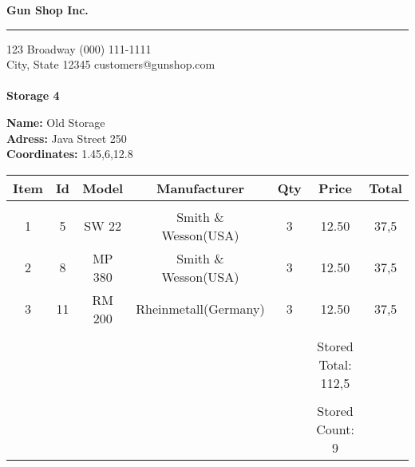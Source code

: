 \documentclass{article}
\begin{document}
\hfil{\Huge\bf Gun Shop Inc.}\hfil
\bigskip
\hrule
\bigskip

123 Broadway \hfill (000) 111-1111 \\
City, State 12345 \hfill customers@gunshop.com\\ \\

\hfill{\bf Storage 4}\hfill
\bigskip

{\bf Name:}   Old Storage\\
{\bf Adress:}  Java Street 250 \\
{\bf Coordinates:}  1.45,6,12.8 \\ 
\begin{center}
\begin{tabular}{ c c c c c c c }
  Item & Id & Model & Manufacturer & Qty & Price & Total  \\[2ex]
\hline\\
 1 & 5 & SW 22& Smith \& Wesson(USA)& 3 & 12.50 & 37,5 \\ [2ex] 2 & 8 & MP 380& Smith \& Wesson(USA)& 3 & 12.50 & 37,5 \\ [2ex] 3 & 11 & RM 200& Rheinmetall(Germany)& 3 & 12.50 & 37,5 \\ [2ex]\hline\\&&&&&Stored Total: 112,5&\\[2ex]\hline\\&&&&&Stored Count: 9&\\[2ex]\end{tabular}\end{center}
\end{document}
